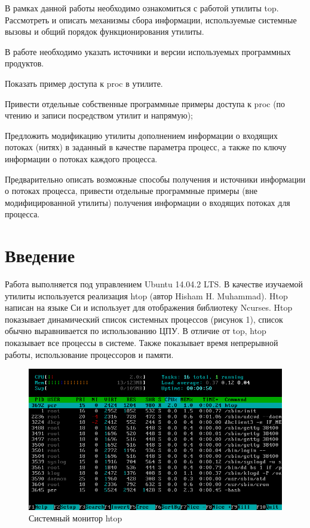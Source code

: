 \documentclass[a4paper, 12pt]{article}		%
\begin{document}
В рамках данной работы необходимо ознакомиться с работой утилиты top. Рассмотреть и описать механизмы сбора информации, используемые системные вызовы и общий порядок функционирования утилиты.
\vspace{3em}

В работе необходимо указать источники и версии используемых программных продуктов.
\vspace{1em}

Показать пример доступа к proc в утилите.
\vspace{1em}

Привести отдельные собственные программные примеры доступа к proc (по чтению и записи посредством утилит и напрямую);
\vspace{1em}

Предложить модификацию утилиты дополнением информации о входящих потоках (нитях) в заданный в качестве параметра процесс, а также по ключу информации о потоках каждого процесса.
\vspace{1em}

Предварительно описать возможные способы получения и источники информации о потоках процесса, привести отдельные программные примеры (вне модифицированной утилиты) получения  информации о входящих потоках для процесса.


\newpage
\section*{Введение}

Работа выполняется под управлением Ubuntu 14.04.2 LTS. В качестве изучаемой утилиты используется реализация htop (автор Hisham H. Muhammad). Htop написан на языке Си и использует для отображения библиотеку Ncurses. Htop показывает динамический список системных процессов (рисунок 1), список обычно выравнивается по использованию ЦПУ. В отличие от top, htop показывает все процессы в системе. Также показывает время непрерывной работы, использование процессоров и памяти.

\begin{figure}[h!]
\centering
\includegraphics[scale=0.65]{res/Htop}
\caption{Системный монитор htop}
\end{figure}
\end{document}
